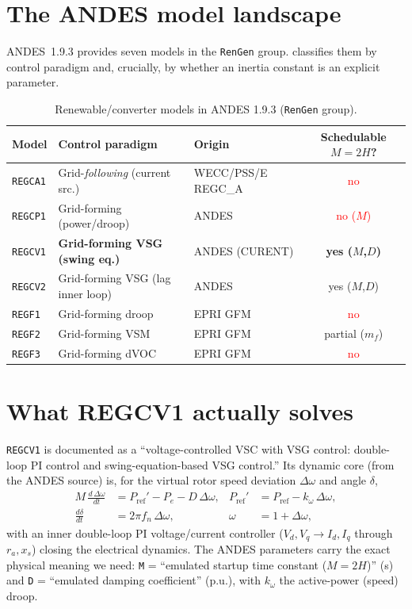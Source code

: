 \documentclass[11pt,a4paper]{article}
\newcommand{\model}[1]{\texttt{#1}}
\begin{document}
\section{The ANDES model landscape}
ANDES~1.9.3 provides seven models in the \texttt{RenGen} group. 
classifies them by control paradigm and, crucially, by whether an inertia
constant is an explicit parameter.

\begin{table}[h]
\centering\small
\caption{Renewable/converter models in ANDES 1.9.3 (\texttt{RenGen} group).}
\label{tab:models}
\begin{tabular}{@{}lllc@{}}
\toprule
Model & Control paradigm & Origin & Schedulable $M{=}2H$?\\
\midrule
\model{REGCA1} & Grid-\emph{following} (current src.) & WECC/PSS/E REGC\_A & \textcolor{red}{no}\\
\model{REGCP1} & Grid-forming (power/droop) & ANDES & \textcolor{red}{no ($M$)}\\
\model{REGCV1} & \textbf{Grid-forming VSG (swing eq.)} & ANDES (CURENT) & \textcolor{green!45!black}{\textbf{yes ($M$,$D$)}}\\
\model{REGCV2} & Grid-forming VSG (lag inner loop) & ANDES & \textcolor{green!45!black}{yes ($M$,$D$)}\\
\model{REGF1} & Grid-forming droop & EPRI GFM & \textcolor{red}{no}\\
\model{REGF2} & Grid-forming VSM & EPRI GFM & partial ($m_f$)\\
\model{REGF3} & Grid-forming dVOC & EPRI GFM & \textcolor{red}{no}\\
\bottomrule
\end{tabular}
\end{table}

\section{What REGCV1 actually solves}
\model{REGCV1} is documented as a ``voltage-controlled VSC with VSG control:
double-loop PI control and swing-equation-based VSG control.'' Its dynamic core
(from the ANDES source) is, for the virtual rotor speed deviation
$\Delta\omega$ and angle $\delta$,
\begin{align}
M\,\frac{d\,\Delta\omega}{dt} &= P_{\mathrm{ref}}' - P_e - D\,\Delta\omega,
& P_{\mathrm{ref}}' &= P_{\mathrm{ref}} - k_\omega\,\Delta\omega, \label{eq:regcv1_swing}\\
\frac{d\delta}{dt} &= 2\pi f_n\,\Delta\omega, & \omega &= 1 + \Delta\omega,
\end{align}
with an inner double-loop PI voltage/current controller
($V_d,V_q\!\to\!I_d,I_q$ through $r_a,x_s$) closing the electrical dynamics. The
ANDES parameters carry the exact physical meaning we need: \model{M} = ``emulated
startup time constant ($M{=}2H$)'' (\si{\second}) and \model{D} = ``emulated
damping coefficient'' (p.u.), with $k_\omega$ the active-power (speed) droop.
\end{document}
